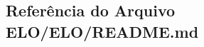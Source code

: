 \hypertarget{ELO_2ELO_2README_8md}{}\subsection{Referência do Arquivo E\+L\+O/\+E\+L\+O/\+R\+E\+A\+D\+M\+E.md}
\label{ELO_2ELO_2README_8md}
